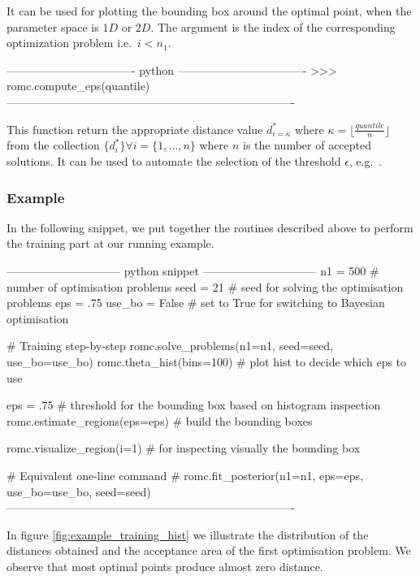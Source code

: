 \noindent

It can be used for plotting the bounding box around the optimal point,
when the parameter space is $1D$ or $2D$. The argument  is the
index of the corresponding optimization problem i.e.\ $i<n_1$.

\begin{Code}
---------------------------------- python ----------------------------------  
>>> romc.compute_eps(quantile)
----------------------------------------------------------------------------
\end{Code}

\noindent
This function return the appropriate distance value $d_{i=\kappa}^*$
where $\kappa = \lfloor \frac{quantile}{n} \rfloor$ from the
collection $\{ d_i^* \} \forall i = \{1, \ldots, n\}$ where $n$ is the
number of accepted solutions. It can be used to automate the selection
of the threshold $\epsilon$, e.g.\
.


\subsubsection*{Example}


In the following snippet, we put together the routines described above
to perform the training part at our running example.

\begin{Code}
------------------------------ python snippet ------------------------------  
  n1 = 500 # number of optimisation problems
  seed = 21 # seed for solving the optimisation problems
  eps = .75 
  use_bo = False # set to True for switching to Bayesian optimisation

  # Training step-by-step
  romc.solve_problems(n1=n1, seed=seed, use_bo=use_bo)
  romc.theta_hist(bins=100) # plot hist to decide which eps to use

  eps = .75 # threshold for the bounding box based on histogram inspection
  romc.estimate_regions(eps=eps) # build the bounding boxes

  romc.visualize_region(i=1) # for inspecting visually the bounding box

  # Equivalent one-line command
  # romc.fit_posterior(n1=n1, eps=eps, use_bo=use_bo, seed=seed)
----------------------------------------------------------------------------  
\end{Code}

In figure \ref{fig:example_training_hist} we illustrate the
distribution of the distances obtained and the acceptance area of the
first optimisation problem. We observe that most optimal points
produce almost zero distance.

